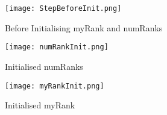 \documentclass{article}
\begin{document}
\begin{enumerate}
	\begin{figure}[p] %
		\begin{center}
			\texttt{[image: StepBeforeInit.png]}
		\caption{Before Initialising myRank and numRanks}
		\label{fig:before_init}
		\end{center}
	\end{figure}
	
	\begin{figure}[p] %
		\begin{center}
			\texttt{[image: numRankInit.png]}
		\caption{Initialised numRanks}
		\label{fig:init_numranks}
		\end{center}
	\end{figure}
	
	\begin{figure}[p] %
		\begin{center}
			\texttt{[image: myRankInit.png]}
		\caption{Initialised myRank}
		\label{fig:init_myrank}
		\end{center}
	\end{figure}

\end{enumerate}
\end{document}
